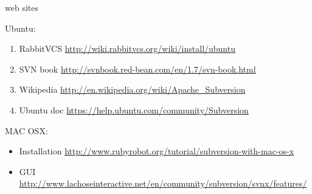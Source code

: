 \documentclass[12pt]{beamer}
\begin{document}
\begin{frame}
	\begin{block}{web sites}
		\tiny{
		Ubuntu:
		\begin{enumerate}
		  \item RabbitVCS \url{http://wiki.rabbitvcs.org/wiki/install/ubuntu}
		  \item SVN book \url{http://svnbook.red-bean.com/en/1.7/svn-book.html}
		  \item Wikipedia \url{http://en.wikipedia.org/wiki/Apache_Subversion}
		  \item Ubuntu doc \url{https://help.ubuntu.com/community/Subversion}
		\end{enumerate}
		MAC OSX:
	  	\begin{itemize}
	  	  \item Installation \url{http://www.rubyrobot.org/tutorial/subversion-with-mac-os-x}
	  	  \item GUI \url{http://www.lachoseinteractive.net/en/community/subversion/svnx/features/}
	  	\end{itemize}
		}
	\end{block}
\end{frame}
\end{document}
